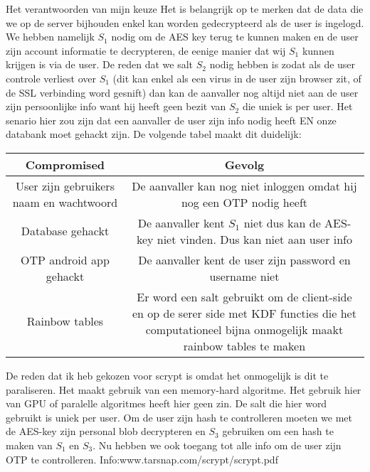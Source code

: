 \documentclass[10pt,a4paper]{report}
\begin{document}
\begin{subsection}{Het verantwoorden van mijn keuze}
Het is belangrijk op te merken dat de data die we op de server bijhouden enkel kan worden gedecrypteerd als de user is ingelogd. We hebben namelijk $S_1$ nodig om de AES key terug te kunnen maken en de user zijn account informatie te decrypteren, de eenige manier dat wij $S_1$ kunnen krijgen is via de user. De reden dat we salt $S_2$ nodig hebben is zodat als de user controle verliest over $S_1$ (dit kan enkel als een virus in de user zijn browser zit, of de SSL verbinding word gesnift) dan kan de aanvaller nog altijd niet aan de user zijn persoonlijke info want hij heeft geen bezit van $S_2$ die uniek is per user. Het senario hier zou zijn dat een aanvaller de user zijn info nodig heeft EN onze databank moet gehackt zijn. De volgende tabel maakt dit duidelijk:
\begin{tabular}{|c|c|}
\hline 
Compromised & Gevolg \\ 
\hline 
User zijn gebruikers naam en wachtwoord & De aanvaller kan nog niet inloggen omdat hij nog een OTP nodig heeft \\ 
\hline 
Database gehackt & De aanvaller kent $S_1$ niet dus kan de AES-key niet vinden. Dus kan niet aan user info \\ 
\hline 
OTP android app gehackt & De aanvaller kent de user zijn password en username niet \\ 
\hline 
Rainbow tables & Er word een salt gebruikt om de client-side en op de serer side met KDF functies die het computationeel bijna onmogelijk maakt rainbow tables te maken \\ 
\hline 
\end{tabular} 
De reden dat ik heb gekozen voor scrypt is omdat het onmogelijk is dit te paraliseren. Het maakt gebruik van een memory-hard algoritme. Het gebruik hier van GPU of paralelle algoritmes heeft hier geen zin. De salt die hier word gebruikt is uniek per user. 
Om de user zijn hash te controlleren moeten we met de AES-key zijn personal blob decrypteren en $S_3$ gebruiken om een hash te maken van $S_1$ en $S_3$. Nu hebben we ook toegang tot alle info om de user zijn OTP te controlleren.
Info:www.tarsnap.com/scrypt/scrypt.pdf
\end{subsection}
\end{document}
